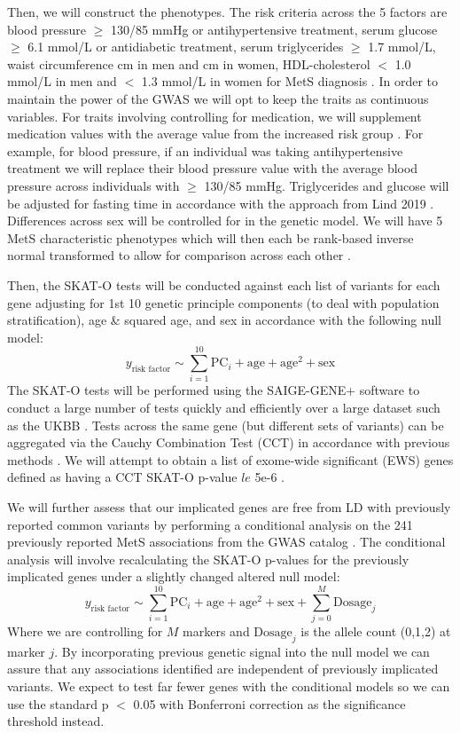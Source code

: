 \documentclass[11pt]{article}
\begin{document}
Then, we will construct the phenotypes. The risk criteria across the 5 factors are blood pressure $\ge$ 130/85 mmHg or antihypertensive treatment, serum glucose $\ge$ 6.1 mmol/L or antidiabetic treatment, serum triglycerides $\ge$ 1.7 mmol/L, waist circumference  cm in men and  cm in women, HDL-cholesterol $<$ 1.0 mmol/L in men and $<$ 1.3 mmol/L in women for MetS diagnosis \cite{pmid31589552}. In order to maintain the power of the GWAS we will opt to keep the traits as continuous variables. For traits involving controlling for medication, we will supplement medication values with the average value from the increased risk group \cite{pmid31589552}. For example, for blood pressure, if an individual was taking antihypertensive treatment we will replace their blood pressure value with the average blood pressure across individuals with $\ge$ 130/85 mmHg. Triglycerides and glucose will be adjusted for fasting time in accordance with the approach from Lind 2019 \cite{pmid31589552}. Differences across sex will be controlled for in the genetic model. We will have 5 MetS characteristic phenotypes which will then each be rank-based inverse normal transformed to allow for comparison across each other \cite{Uffelmann2021}.

Then, the SKAT-O tests will be conducted against each list of variants for each gene adjusting for 1st 10 genetic principle components (to deal with population stratification), age \& squared age, and sex in accordance with the following null model:
$$y_{\text{risk factor}} \sim \sum_{i=1}^{10} \text{PC}_i + \text{age} + \text{age}^2 + \text{sex}$$
The SKAT-O tests will be performed using the SAIGE-GENE+ software to conduct a large number of tests quickly and efficiently over a large dataset such as the UKBB \cite{Zhou2022}. Tests across the same gene (but different sets of variants) can be aggregated via the Cauchy Combination Test (CCT) in accordance with previous methods \cite{Zhou2022}. We will attempt to obtain a list of exome-wide significant (EWS) genes defined as having a CCT SKAT-O p-value $le$ 5e-6 \cite{Zhou2022}. 

We will further assess that our implicated genes are free from LD with previously reported common variants by performing a conditional analysis on the 241 previously reported MetS associations from the GWAS catalog \cite{Buniello2019-yh}. The conditional analysis will involve recalculating the SKAT-O p-values for the previously implicated genes under a slightly changed altered null model:
$$y_{\text{risk factor}} \sim \sum_{i=1}^{10} \text{PC}_i + \text{age} + \text{age}^2 + \text{sex} + \sum_{j=0}^{M}\text{Dosage}_j$$
Where we are controlling for $M$ markers and $\text{Dosage}_j$ is the allele count (0,1,2) at marker $j$. By incorporating previous genetic signal into the null model we can assure that any associations identified are independent of previously implicated variants. We expect to test far fewer genes with the conditional models so we can use the standard p $<$ 0.05 with Bonferroni correction as the significance threshold instead.
\end{document}
